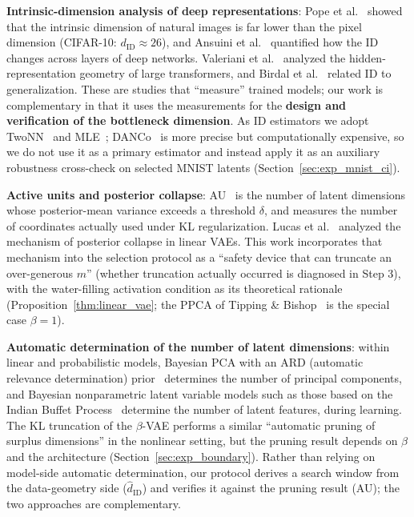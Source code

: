\documentclass[make,article,submit,pdftex,moreauthors]{Definitions/mdpi}
\newcommand{\dID}{d_{\mathrm{ID}}}
\newcommand{\hatdID}{\hat{d}_{\mathrm{ID}}}
\begin{document}
\textbf{Intrinsic-dimension analysis of deep representations}:
Pope et al.~\cite{pope2021intrinsic} showed that the intrinsic dimension of
natural images is far lower than the pixel dimension (CIFAR-10:
$\dID \approx 26$), and Ansuini et al.~\cite{ansuini2019intrinsic}
quantified how the ID changes across layers of deep networks.
Valeriani et al.~\cite{valeriani2023geometry} analyzed the hidden-representation
geometry of large transformers, and Birdal et
al.~\cite{birdal2021intrinsic} related ID to generalization.
These are studies that ``measure'' trained models; our work is complementary
in that it uses the measurements for the \textbf{design and verification of
the bottleneck dimension}.
As ID estimators we adopt TwoNN~\cite{facco2017twonn} and
MLE~\cite{levina2005mle}; DANCo~\cite{ceruti2014danco} is more precise but
computationally expensive, so we do not use it as a primary estimator and
instead apply it as an auxiliary robustness cross-check on selected MNIST
latents (Section~\ref{sec:exp_mnist_ci}).

\textbf{Active units and posterior collapse}:
AU~\cite{higgins2017betavae,lucas2019elbo} is the number of latent
dimensions whose posterior-mean variance exceeds a threshold $\delta$, and
measures the number of coordinates actually used under KL regularization.
Lucas et al.~\cite{lucas2019elbo} analyzed the mechanism of posterior
collapse in linear VAEs.
This work incorporates that mechanism into the selection protocol as a
``safety device that can truncate an over-generous $m$'' (whether truncation
actually occurred is diagnosed in Step 3), with the water-filling activation
condition as its theoretical rationale
(Proposition~\ref{thm:linear_vae}; the PPCA of Tipping \&
Bishop~\cite{tippingbishop1999ppca} is the special case $\beta = 1$).

\textbf{Automatic determination of the number of latent dimensions}:
within linear and probabilistic models, Bayesian PCA with an ARD (automatic
relevance determination) prior~\cite{bishop1999bayesian} determines the
number of principal components, and Bayesian nonparametric latent variable
models such as those based on the Indian Buffet
Process~\cite{ghahramani2005infinite} determine the number of latent
features, during learning.
The KL truncation of the $\beta$-VAE performs a similar ``automatic pruning
of surplus dimensions'' in the nonlinear setting, but the pruning result
depends on $\beta$ and the architecture (Section~\ref{sec:exp_boundary}).
Rather than relying on model-side automatic determination, our protocol
derives a search window from the data-geometry side ($\hatdID$) and
verifies it against the pruning result (AU); the two approaches are
complementary.
\end{document}
